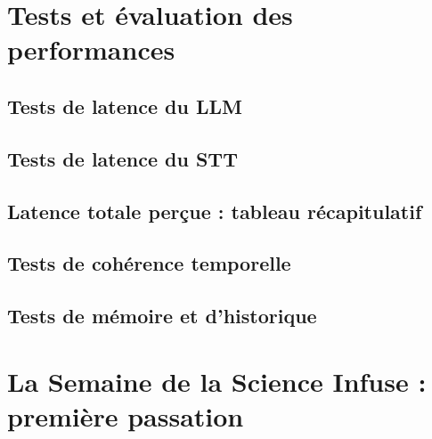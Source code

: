 \documentclass[11pt]{article}
\begin{document}
\newpage

\section{Tests et évaluation des performances}

\subsection{Tests de latence du LLM}

\subsection{Tests de latence du STT}

\subsection{Latence totale perçue : tableau récapitulatif}

\subsection{Tests de cohérence temporelle}

\subsection{Tests de mémoire et d'historique}

\newpage

\section{La Semaine de la Science Infuse : première passation}
\label{sec:scienceinfuse}
\end{document}
